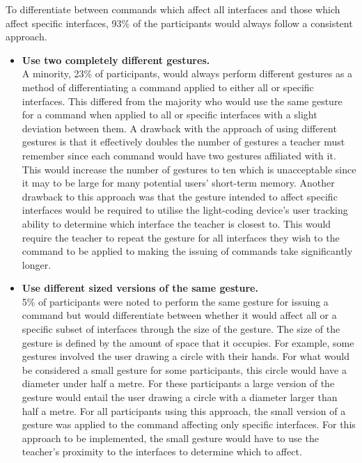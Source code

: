 \documentclass[link]{IWCOMP}
\begin{document}
To differentiate between commands which affect all interfaces and those which affect specific interfaces, 93\% of the participants would always follow a consistent approach.

\begin{itemize}

\item \textbf{Use two completely different gestures.}\\
A minority, 23\% of participants, would always perform different gestures as a method of differentiating a command applied to either all or specific interfaces.
This differed from the majority who would use the same gesture for a command when applied to all or specific interfaces with a slight deviation between them.
A drawback with the approach of using different gestures is that it effectively doubles the number of gestures a teacher must remember since each command would have two gestures affiliated with it.
This would increase the number of gestures to ten which is unacceptable since it may to be large for many potential users' short-term memory.
Another drawback to this approach was that the gesture intended to affect specific interfaces would be required to utilise the light-coding device's user tracking ability to determine which interface the teacher is closest to.
This would require the teacher to repeat the gesture for all interfaces they wish to the command to be applied to making the issuing of commands take significantly longer.

\item \textbf{Use different sized versions of the same gesture.}\\
5\% of participants were noted to perform the same gesture for issuing a command but would differentiate between whether it would affect all or a specific subset of interfaces through the size of the gesture.
The size of the gesture is defined by the amount of space that it occupies.
For example, some gestures involved the user drawing a circle with their hands.
For what would be considered a small gesture for some participants, this circle would have a diameter under half a metre.
For these participants a large version of the gesture would entail the user drawing a circle with a diameter larger than half a metre.
For all participants using this approach, the small version of a gesture was applied to the command affecting only specific interfaces.
For this approach to be implemented, the small gesture would have to use the teacher's proximity to the interfaces to determine which to affect.


\end{itemize}
\end{document}
